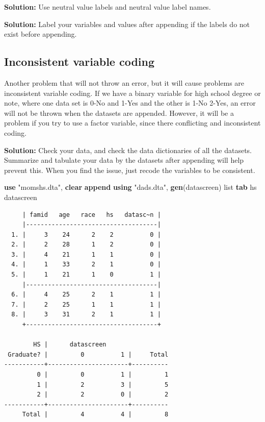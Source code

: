 \documentclass[
]{book}
\newenvironment{Shaded}{\begin{snugshade}}{\end{snugshade}}
\newcommand{\KeywordTok}[1]{\textcolor[rgb]{0.13,0.29,0.53}{\textbf{#1}}}
\newcommand{\NormalTok}[1]{#1}
\newcommand{\OtherTok}[1]{\textcolor[rgb]{0.56,0.35,0.01}{#1}}
\newcommand{\StringTok}[1]{\textcolor[rgb]{0.31,0.60,0.02}{#1}}
\begin{document}
\textbf{Solution:} Use neutral value labels and neutral value label names.

\textbf{Solution:} Label your variables and values after appending if the labels do not exist before appending.

\subsection{Inconsistent variable coding}\label{inconsistent-variable-coding}

Another problem that will not throw an error, but it will cause problems are inconsistent variable coding. If we have a binary variable for high school degree or note, where one data set is 0-No and 1-Yes and the other is 1-No 2-Yes, an error will not be thrown when the datasets are appended.
However, it will be a problem if you try to use a factor variable, since there conflicting and inconsistent coding.

\textbf{Solution:} Check your data, and check the data dictionaries of all the datasets.
Summarize and tabulate your data by the datasets after appending will help prevent this. When you find the issue, just recode the variables to be consistent.

\begin{Shaded}
\begin{Highlighting}[]
\KeywordTok{use} \StringTok{"momshs.dta"}\NormalTok{, }\KeywordTok{clear}
\KeywordTok{append} \KeywordTok{using} \StringTok{"dads.dta"}\NormalTok{, }\KeywordTok{gen}\NormalTok{(datascreen)}
\OtherTok{list}
\KeywordTok{tab}\NormalTok{ hs datascreen}
\end{Highlighting}
\end{Shaded}

\begin{verbatim}
     | famid   age   race   hs   datasc~n |
     |------------------------------------|
  1. |     3    24      2    2          0 |
  2. |     2    28      1    2          0 |
  3. |     4    21      1    1          0 |
  4. |     1    33      2    1          0 |
  5. |     1    21      1    0          1 |
     |------------------------------------|
  6. |     4    25      2    1          1 |
  7. |     2    25      1    1          1 |
  8. |     3    31      2    1          1 |
     +------------------------------------+

        HS |      datascreen
 Graduate? |         0          1 |     Total
-----------+----------------------+----------
         0 |         0          1 |         1 
         1 |         2          3 |         5 
         2 |         2          0 |         2 
-----------+----------------------+----------
     Total |         4          4 |         8 
\end{verbatim}
\end{document}
